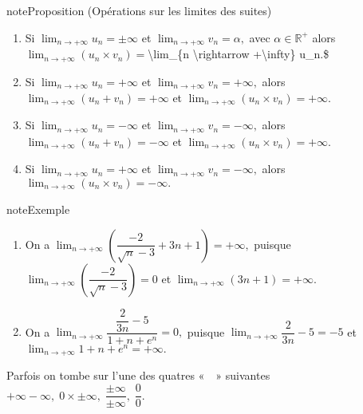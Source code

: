 \documentclass[letterpaper,10pt,french]{jupyterBook}
\begin{document}
\begin{sphinxadmonition}{note}{Proposition (Opérations sur les limites des suites)}
\begin{enumerate}
\item {} 
\sphinxAtStartPar
Si \(\lim_{n \rightarrow +\infty} u_n=\pm\infty\) et \(\lim_{n \rightarrow +\infty} v_n=\alpha,\) avec \(\alpha\in \mathbb{R}^{+}\) alors \(\lim_{n \rightarrow +\infty} (u_n \times v_n)=\)\textbackslash{}lim\_\{n \textbackslash{}rightarrow +\textbackslash{}infty\} u\_n.\$

\item {} 
\sphinxAtStartPar
Si \(\lim_{n \rightarrow +\infty} u_n=+\infty\) et \(\lim_{n \rightarrow +\infty} v_n=+\infty,\) alors \(\lim_{n \rightarrow +\infty} (u_n+v_n)=+\infty\) et \(\lim_{n \rightarrow +\infty}(u_n\times v_n)=+\infty.\)

\item {} 
\sphinxAtStartPar
Si \(\lim_{n \rightarrow +\infty} u_n=-\infty\) et \(\lim_{n \rightarrow +\infty} v_n=-\infty,\) alors \(\lim_{n \rightarrow +\infty} (u_n+v_n)=-\infty\) et \(\lim_{n \rightarrow +\infty} (u_n\times v_n)=+\infty.\)

\item {} 
\sphinxAtStartPar
Si \(\lim_{n \rightarrow +\infty} u_n=+\infty\) et \(\lim_{n \rightarrow +\infty} v_n=-\infty,\) alors \(\lim_{n \rightarrow +\infty} (u_n\times v_n)=-\infty.\)

\end{enumerate}
\end{sphinxadmonition}

\begin{sphinxadmonition}{note}{Exemple}
\begin{enumerate}
%
\item {} 
\sphinxAtStartPar
On a \(\lim_{n \rightarrow +\infty}(\dfrac{-2}{\sqrt{n}-3}+3n+1)=+\infty,\) puisque \(\lim_{n \rightarrow +\infty}(\dfrac{-2}{\sqrt{n}-3}) =0\) et \(\lim_{n \rightarrow +\infty}(3n+1)=+\infty.\)

\item {} 
\sphinxAtStartPar
On a \(\lim_{n \rightarrow +\infty}\dfrac{\dfrac{2}{3n}-5}{1+n+e^n}=0,\) puisque \(\lim_{n \rightarrow +\infty}\dfrac{2}{3n}-5=-5\) et \(\lim_{n \rightarrow +\infty}1+n+e^n=+\infty.\)

\end{enumerate}
\end{sphinxadmonition}

\sphinxAtStartPar
Parfois on tombe sur l’une des quatres «  » suivantes \(+\infty-\infty,\;0\times \pm\infty,\;\dfrac{\pm\infty}{\pm\infty},\;\dfrac{0}{0}.\)
\end{document}
